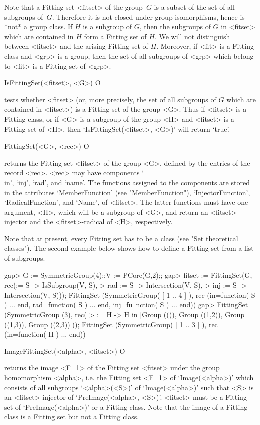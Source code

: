 Note that a Fitting set <fitset> of the group~$G$ is a subset of the set of all
subgroups of~$G$. Therefore it is not closed under group
isomorphisms, hence  is *not* a group class. If $H$ is a subgroup of $G$, then the
subgroups of $G$ in <fitset> which are contained in $H$ form a Fitting set of $H$.
We will not distinguish between <fitset> and the arising Fitting set of $H$. 
Moreover, if  <fit> is a Fitting class and <grp> is a group, then the set of all
subgroups of <grp> which belong to <fit> is a Fitting set of <grp>.

\>IsFittingSet(<fitset>, <G>) O

tests whether <fitset> (or, more precisely, the set of all subgroups of $G$
which are contained in  <fitset>) is a Fitting set of the group <G>. Thus if
<fitset> is a Fitting class, or if
<G> is a subgroup of the group <H> and <fitset> is a Fitting set of <H>,
then `IsFittingSet(<fitset>, <G>)' will return `true'.

\>FittingSet(<G>, <rec>) O

returns the Fitting set <fitset> of the group <G>, defined by the entries of the
record <rec>. <rec> may have components `\\in', `inj', `rad', and `name'. The
functions assigned to the components are stored in the attributes
`MemberFunction' (see "MemberFunction"), `InjectorFunction', 
`RadicalFunction', and `Name', of <fitset>. The latter functions must have one
argument, <H>, which will be a subgroup of <G>, and return an <fitset>-injector
and the <fitset>-radical of <H>, respectively.

Note that at present, every Fitting set has to be a class (see "Set theoretical
classes"). The second example below shows how to define a Fitting set from 
a list of subgroups.


\beginexample
gap> G := SymmetricGroup(4);;V := PCore(G,2);;
gap> fitset := FittingSet(G, rec(\in := S -> IsSubgroup(V, S),
> rad := S -> Intersection(V, S),
> inj := S -> Intersection(V, S)));
FittingSet (SymmetricGroup( 
[ 1 .. 4 ] ), rec (in=function( S ) ... end, rad=function( S ) ... end, inj=fu\
nction( S ) ... end))
gap> FittingSet (SymmetricGroup (3), rec(
> \in := H -> H in [Group (()), Group ((1,2)), Group ((1,3)), Group ((2,3))]));
FittingSet (SymmetricGroup( [ 1 .. 3 ] ), rec (in=function( H ) ... end))
\endexample

\>ImageFittingSet(<alpha>, <fitset>) O

returns the image <F_1> of the Fitting set <fitset> under the group homomorphism 
<alpha>, i.e.
the Fitting set <F_1> of `Image(<alpha>)' which consists of all subgroups
`<alpha>(<S>)' of `Image(<alpha>)' such that <S> is an <fitset>-injector of 
`PreImage(<alpha>, <S>)'. <fitset> must be a Fitting set of `PreImage(<alpha>)'
or a Fitting class.  Note that the image of a Fitting class is a
Fitting set but not a Fitting class.


